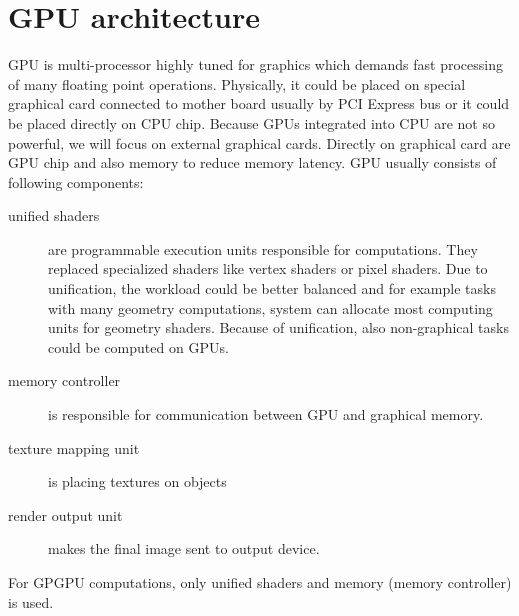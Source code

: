 \section{GPU architecture}
GPU is multi-processor highly tuned for graphics which demands fast processing of many floating point operations. Physically, it could be placed on special graphical card connected to mother board usually by PCI Express bus or it could be placed directly on CPU chip. Because GPUs integrated into CPU are not so powerful, we will focus on external graphical cards. Directly on graphical card are GPU chip and also memory to reduce memory latency. GPU usually consists of following components:
\begin{description}
\item[unified shaders] are programmable execution units responsible for computations. They replaced specialized shaders like vertex shaders or pixel shaders. Due to unification, the workload could be better balanced and for example tasks with many geometry computations, system can allocate most computing units for geometry shaders. Because of unification, also non-graphical tasks could be computed on GPUs.
\item[memory controller] is responsible for communication between GPU and graphical memory.
\item[texture mapping unit] is placing textures on objects
\item[render output unit] makes the final image sent to output device.
\end{description}
For GPGPU computations, only unified shaders and memory (memory controller) is used.

